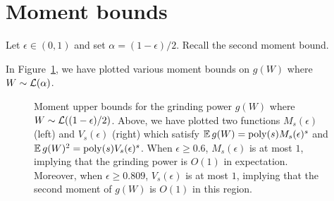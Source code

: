 \section{Moment bounds}\label{sec:praos-discussion-moment-bounds}
Let $\epsilon \in (0,1)$ and set $\alpha = (1-\epsilon)/2$. 
Recall the second moment bound.

In Figure~\ref{fig:praos-gp-moments-exact}, 
we have plotted various moment bounds on $g(W)$ 
where $W \sim \mathcal{L}(\alpha)$. 


  \begin{figure}[!htb]
    \centering
    \caption[GP moment bounds for Praos]{
      Moment upper bounds for the grinding power $g(W)$ 
      where $W \sim \mathcal{L}((1-\epsilon)/2)$.
      Above, we have plotted two functions $M_s(\epsilon)$ (left) and $V_s(\epsilon)$ (right) which satisfy 
      $\operatorname{\mathbb{E}} g(W) = \mathrm{poly}(s) M_s(\epsilon)^s$ and $\operatorname{\mathbb{E}} g(W)^2 = \mathrm{poly}(s) V_s(\epsilon)^s$. 
      When $\epsilon \geq 0.6$, $M_s(\epsilon)$ is at most $1$, 
      implying that the grinding power is $O(1)$ in expectation.
      Moreover, when $\epsilon \geq 0.809$, $V_s(\epsilon)$ is at most $1$, 
      implying that the second moment of $g(W)$ is $O(1)$ in this region. 
    }
    \label{fig:praos-gp-moments-exact}
  \end{figure}


